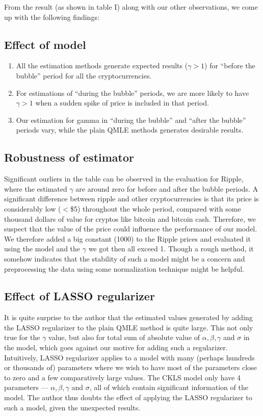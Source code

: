 \begin{spacing}{1.5}
From the result (as shown in table I) along with our other observations, we come up with the following findings:

\subsection{Effect of model}
\begin{enumerate}
\item All the estimation methods generate expected results ($\gamma>1$) for ``before the bubble'' period for all the cryptocurrencies. 
\item For estimations of ``during the bubble'' periods, we are more likely to have $\gamma>1$ when a sudden spike of price is included in that period.
\item Our estimation for gamma in ``during the bubble'' and ``after the bubble'' periods vary, while the plain QMLE methods generates desirable results.  
\end{enumerate}

\subsection{Robustness of estimator}
Significant ourliers in the table can be observed in the evaluation for Ripple, where the estimated $\gamma$ are around zero for before and after the bubble periods. A significant difference between ripple and other cryptocurrencies is that its price is considerably low ($<$\$5) throughout the whole period, compared with some thousand dollars of value for cryptos like bitcoin and bitcoin cash. Therefore, we suspect that the value of the price could influence the performance of our model. We therefore added a big constant (1000) to the Ripple prices and evaluated it using the model and the $\gamma$ we got then all exceed 1. Though a rough method, it somehow indicates that the stability of such a model might be a concern and preprocessing the data using some normalization technique might be helpful.

\subsection{Effect of LASSO regularizer}

It is quite surprise to the author that the estimated values generated by adding the LASSO regularizer to the plain QMLE method is quite large. This not only true for the $\gamma$ value, but also for total sum of absolute value of $\alpha, \beta, \gamma$ and $\sigma$ in the model, which goes against our motive for adding such a regularizer. Intuitively, LASSO regularizer applies to a model with many (perhaps hundreds or thousands of) parameters where we wish to have most of the parameters close to zero and a few comparatively large values. The CKLS model only have 4 parameters --- $\alpha, \beta, \gamma$ and $\sigma$, all of which contain significant information of the model. The author thus doubts the effect of applying the LASSO regularizer to such a model, given the unexpected results.


\end{spacing}
